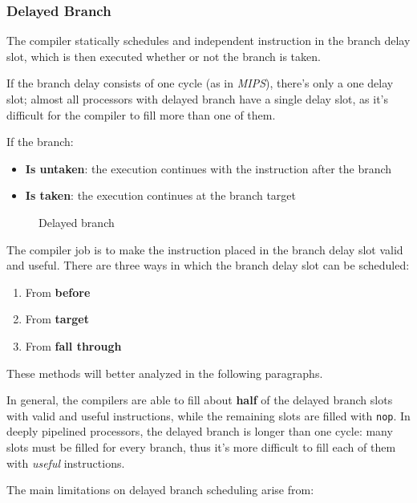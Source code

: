 \documentclass[english]{article}
\begin{document}
\subsubsection{Delayed Branch}
\label{sec:delayed-branch}

The compiler statically schedules and independent instruction in the branch delay slot, which is then executed whether or not the branch is taken.

If the branch delay consists of one cycle (as in \textit{MIPS}), there's only a one delay slot;
almost all processors with delayed branch have a single delay slot, as it's difficult for the compiler to fill more than one of them.

If the branch:

\begin{itemize}
  \item \textbf{Is untaken}: the execution continues with the instruction after the branch
  \item \textbf{Is taken}: the execution continues at the branch target
\end{itemize}

\begin{figure}[htbp]
  \bigskip
  \centering
  \caption{Delayed branch}
  \label{fig:delayed-branch}
  \bigskip
\end{figure}

The compiler job is to make the instruction placed in the branch delay slot valid and useful.
There are three ways in which the branch delay slot can be scheduled:

\begin{enumerate}
  \item From \textbf{before}
  \item From \textbf{target}
  \item From \textbf{fall through}
\end{enumerate}

These methods will better analyzed in the following paragraphs.

\bigskip
In general, the compilers are able to fill about \textbf{half} of the delayed branch slots with valid and useful instructions, while the remaining slots are filled with \texttt{nop}.
In deeply pipelined processors, the delayed branch is longer than one cycle: many slots must be filled for every branch, thus it's more difficult to fill each of them with \textit{useful} instructions.

\bigskip
The main limitations on delayed branch scheduling arise from:
\end{document}
